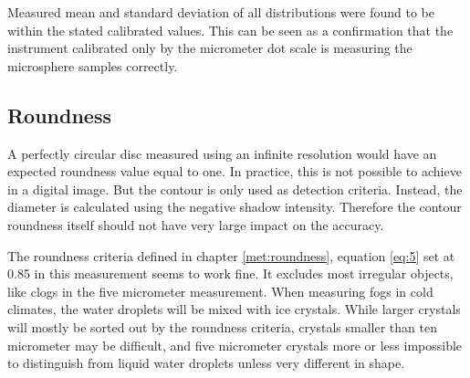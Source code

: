 Measured mean and standard deviation of all distributions were found to be within the stated calibrated values. This can be seen as a confirmation that the instrument calibrated only by the micrometer dot scale is measuring the microsphere samples correctly.

\subsection{Roundness}

A perfectly circular disc measured using an infinite resolution would have an expected roundness value equal to one. In practice, this is not possible to achieve in a digital image. But the contour is only used as detection criteria. Instead, the diameter is calculated using the negative shadow intensity. Therefore the contour roundness itself should not have very large impact on the accuracy.

The roundness criteria defined in chapter \ref{met:roundness}, equation \ref{eq:5} set at 0.85 in this measurement seems to work fine. It excludes most irregular objects, like clogs in the five micrometer measurement. When measuring fogs in cold climates, the water droplets will be mixed with ice crystals. While larger crystals will mostly be sorted out by the roundness criteria, crystals smaller than ten micrometer may be difficult, and five micrometer crystals more or less impossible to distinguish from liquid water droplets unless very different in shape.

